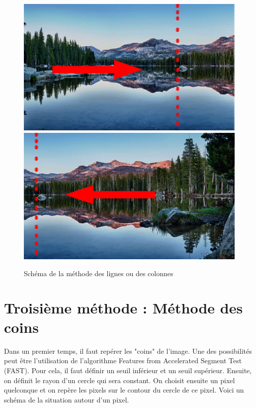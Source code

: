 \documentclass[a4paper,french,12pt]{report}
\begin{document}
		    \begin{figure}[h]
		     \begin{center}
		      \includegraphics[scale=.18]{images/panorama2.png} \includegraphics[scale=.18]{images/panorama1.png}
		      \caption{Schéma de la méthode des lignes ou des colonnes}
		     \end{center}
  
		    \end{figure}
		    
		\section{Troisième méthode : Méthode des coins}
		    Dans un premier temps, il faut repérer les "coins" de l'image. Une des possibilités peut être l'utilisation de l'algorithme Features from Accelerated Segment Test (FAST). Pour cela, il faut définir un seuil inférieur et un seuil supérieur. Ensuite, on définit le rayon d'un cercle qui sera constant. On choisit ensuite un pixel quelconque et on repère les pixels sur le contour du cercle de ce pixel. Voici un schéma de la situation autour d'un pixel.\\
		    
\end{document}
